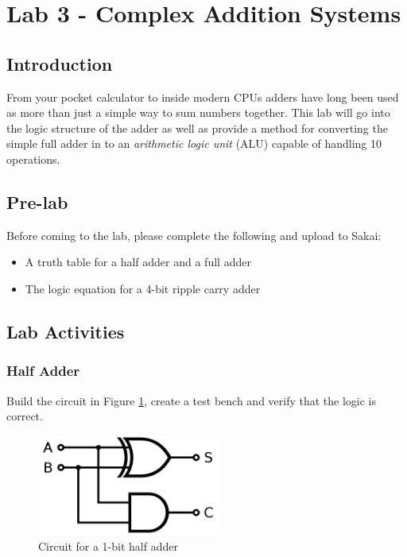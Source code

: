 \section{Lab 3 - Complex Addition Systems}

\subsection{Introduction}
From your pocket calculator to inside modern CPUs adders have long been used as more than just a simple way to sum numbers together. This lab will go into the logic structure of the adder as well as provide a method for converting the simple full adder in to an \emph{arithmetic logic unit} (ALU) capable of handling 10 operations. 

\subsection{Pre-lab}
Before coming to the lab, please complete the following and upload to Sakai:
\begin{itemize}
	\item A truth table for a half adder and a full adder
	\item The logic equation for a 4-bit ripple carry adder
\end{itemize}

\subsection{Lab Activities}

\subsubsection{Half Adder}
Build the circuit in Figure \ref{fig:halfadder}, create a test bench and verify that the logic is correct.

\begin{figure}[H]
	\centering
	\includegraphics[width=60mm]{Lab3/figures/halfadder.png}
	\caption{Circuit for a 1-bit half adder}
	\label{fig:halfadder}
\end{figure}

